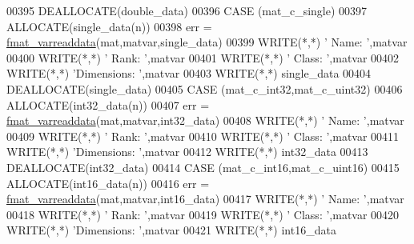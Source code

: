 \begin{DoxyCode}
{00395                     \textcolor{keyword}{DEALLOCATE}(double\_data)
00396                 \textcolor{keywordflow}{CASE} (mat\_c\_single)
00397                     \textcolor{keyword}{ALLOCATE}(single\_data(n))
00398                     err = \hyperlink{interfacematio_1_1fmat__varreaddata}{fmat\_varreaddata}(mat,matvar,single\_data)
00399                     \textcolor{keyword}{WRITE}(*,*) \textcolor{stringliteral}{'      Name: '},matvar%
00400                     \textcolor{keyword}{WRITE}(*,*) \textcolor{stringliteral}{'      Rank: '},matvar%
00401                     \textcolor{keyword}{WRITE}(*,*) \textcolor{stringliteral}{'     Class: '},matvar%
00402                     \textcolor{keyword}{WRITE}(*,*) \textcolor{stringliteral}{'Dimensions: '},matvar%
00403                     \textcolor{keyword}{WRITE}(*,*) single\_data
00404                     \textcolor{keyword}{DEALLOCATE}(single\_data)
00405                 \textcolor{keywordflow}{CASE} (mat\_c\_int32,mat\_c\_uint32)
00406                     \textcolor{keyword}{ALLOCATE}(int32\_data(n))
00407                     err = \hyperlink{interfacematio_1_1fmat__varreaddata}{fmat\_varreaddata}(mat,matvar,int32\_data)
00408                     \textcolor{keyword}{WRITE}(*,*) \textcolor{stringliteral}{'      Name: '},matvar%
00409                     \textcolor{keyword}{WRITE}(*,*) \textcolor{stringliteral}{'      Rank: '},matvar%
00410                     \textcolor{keyword}{WRITE}(*,*) \textcolor{stringliteral}{'     Class: '},matvar%
00411                     \textcolor{keyword}{WRITE}(*,*) \textcolor{stringliteral}{'Dimensions: '},matvar%
00412                     \textcolor{keyword}{WRITE}(*,*) int32\_data
00413                     \textcolor{keyword}{DEALLOCATE}(int32\_data)
00414                 \textcolor{keywordflow}{CASE} (mat\_c\_int16,mat\_c\_uint16)
00415                     \textcolor{keyword}{ALLOCATE}(int16\_data(n))
00416                     err = \hyperlink{interfacematio_1_1fmat__varreaddata}{fmat\_varreaddata}(mat,matvar,int16\_data)
00417                     \textcolor{keyword}{WRITE}(*,*) \textcolor{stringliteral}{'      Name: '},matvar%
00418                     \textcolor{keyword}{WRITE}(*,*) \textcolor{stringliteral}{'      Rank: '},matvar%
00419                     \textcolor{keyword}{WRITE}(*,*) \textcolor{stringliteral}{'     Class: '},matvar%
00420                     \textcolor{keyword}{WRITE}(*,*) \textcolor{stringliteral}{'Dimensions: '},matvar%
00421                     \textcolor{keyword}{WRITE}(*,*) int16\_data
}
\end{DoxyCode}
